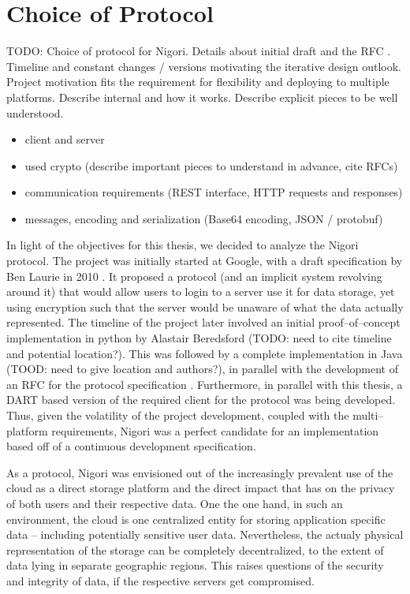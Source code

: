 \section{Choice of Protocol}
TODO: Choice of protocol for Nigori. Details about initial draft \cite{NigoriDraft} and the \wip RFC \cite{NigoriRFC}. Timeline and constant changes / versions motivating the iterative design outlook. Project motivation fits the requirement for flexibility and deploying to multiple platforms. Describe internal and how it works. Describe explicit pieces to be well understood.
\begin{itemize}
  \item client and server
  \item used crypto (describe important pieces to understand in advance, cite RFCs)
  \item communication requirements (REST interface, HTTP requests and responses)
  \item messages, encoding and serialization (Base64 encoding, JSON / protobuf)
\end{itemize}

In light of the objectives for this thesis, we decided to analyze the Nigori protocol.
The project was initially started at Google, with a draft specification by Ben Laurie in 2010 \cite{NigoriDraft}.
It proposed a protocol (and an implicit system revolving around it) that would allow users to login to a server use it for data storage, yet using encryption such that the server would be unaware of what the data actually represented.
The timeline of the project later involved an initial proof--of--concept implementation in python by Alastair Beredsford (TODO: need to cite timeline and potential location?).
This was followed by a complete implementation in Java (TOOD: need to give location and authors?), in parallel with the development of an RFC for the protocol specification \cite{NigoriRFC}.
Furthermore, in parallel with this thesis, a DART based version of the required client for the protocol was being developed.
Thus, given the volatility of the project development, coupled with the multi--platform requirements, Nigori was a perfect candidate for an implementation based off of a continuous development specification.

As a protocol, Nigori was envisioned out of the increasingly prevalent use of the cloud as a direct storage platform and the direct impact that has on the privacy of both users and their respective data.
One the one hand, in such an environment, the cloud is one centralized entity for storing application specific data -- including potentially sensitive user data.
Nevertheless, the actualy physical representation of the storage can be completely decentralized, to the extent of data lying in separate geographic regions.
This raises questions of the security and integrity of data, if the respective servers get compromised.

